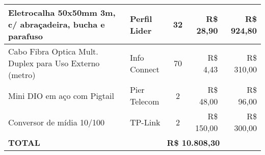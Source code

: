 \begin{table}[H]
{\begin{tabular}{|l|l|c|r|r|}
		Eletrocalha 50x50mm 3m, c/ abraçadeira, bucha e parafuso       & Perfil Lider                    & 32     & R\$ 28,90                      & R\$ 924,80                 \\ \hline
		Cabo Fibra Optica Mult. Duplex para Uso Externo (metro)        & Info Connect                    & 70     & R\$ 4,43                       & R\$ 310,00                 \\ \hline
		Mini DIO em aço com Pigtail                                    & Pier Telecom                    & 2      & R\$ 48,00                      & R\$ 96,00                  \\ \hline
		Conversor de mídia 10/100                                      & TP-Link                         & 2      & R\$ 150,00                     & R\$ 300,00                 \\ \hline
		\textbf{TOTAL}                                                 & \multicolumn{4}{c|}{\textbf{R\$ 10.808,30}}                                                            \\ \hline
	\end{tabular}
}
\end{table}